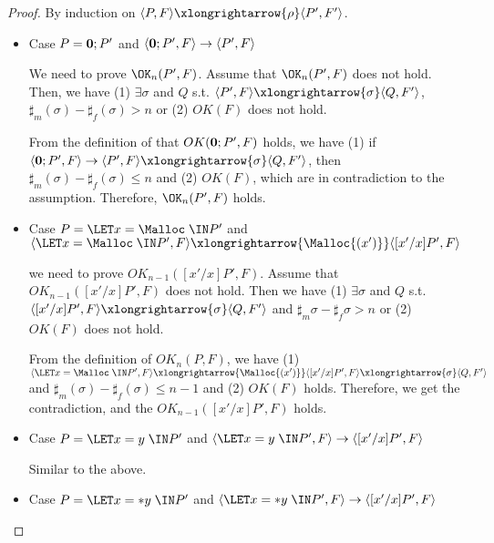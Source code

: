 \begin{proof}
By induction on \(\langle P, F \rangle \xlongrightarrow{\rho} \langle P', F' \rangle \).

\begin{itemize}

\item Case \(P = {\bf 0};P'\) and \( \langle {\bf 0};P', F \rangle \rightarrow \langle P', F \rangle\)

  We need to prove \(\OK_n(P', F)\).  Assume that \(\OK_n(P', F)\)
  does not hold. Then, we have (1) \( \exists \sigma \) and \(Q\) s.t. \(
  \langle P', F \rangle \xlongrightarrow{\sigma} \langle Q, F' \rangle
  \), \(\sharp_{m}(\sigma) - \sharp_{f}(\sigma) > n\) or (2) \(
  OK(F)\) does not hold.

  From the definition of that \(OK({\bf 0};P', F)\) holds, we have (1)
  if \( \langle {\bf 0};P', F \rangle \rightarrow \langle P', F
  \rangle \xlongrightarrow{\sigma} \langle Q, F' \rangle \), then
  \(\sharp_m(\sigma) - \sharp_f(\sigma) \le n \) and (2) \(OK(F)\),
  which are in contradiction to the assumption. Therefore, \(\OK_n(P',
  F)\) holds.

\item Case \(P = \LET x = \Malloc \; \IN P'\) and \( \langle \LET x =
  \Malloc \; \IN P', F \rangle \xlongrightarrow{\Malloc{(x')}} \langle
          [x'/x]P', F \rangle\)

  we need to prove \(OK_{n-1}([x'/x]P', F)\). Assume that
  \(OK_{n-1}([x'/x]P', F)\) does not hold. Then we have (1) \(\exists
  \sigma\) and \(Q\) s.t. \( \langle [x'/x]P', F\rangle \xlongrightarrow{\sigma} \langle Q, F' \rangle\) and \(\sharp_m{\sigma} - \sharp_f{\sigma} > n \) or (2) \(OK(F)\) does not hold.

  From the definition of \(OK_n(P, F)\), we have (1) \( \langle \LET x
  = \Malloc \; \IN P', F \rangle \xlongrightarrow{\Malloc{(x')}}
  \langle [x'/x]P', F \rangle \xlongrightarrow{\sigma} \langle Q, F'
  \rangle\) and \(\sharp_m(\sigma) - \sharp_f(\sigma) \le n - 1 \) and
  (2) \(OK(F)\) holds. Therefore, we get the contradiction, and the
  \(OK_{n-1}([x'/x]P', F)\) holds.

\item Case \(P = \LET x = y \; \IN P'\) and \( \langle \LET x = y \;
  \IN P', F \rangle \rightarrow \langle [x'/x]P', F \rangle\)

  Similar to the above.
  
\item Case \(P = \LET x = *y \; \IN P'\) and \( \langle \LET x = *y \;
  \IN P', F \rangle \rightarrow \langle [x'/x]P', F \rangle\)


\end{itemize}
\end{proof}
